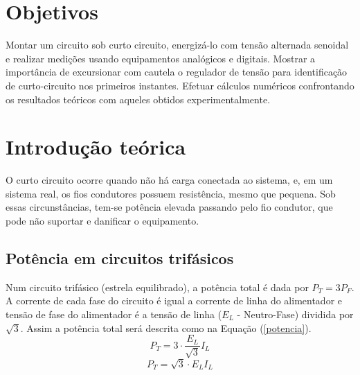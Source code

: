 \documentclass[a4paper,12pt,oneside,openany,table,xcdraw]{article}
\begin{document}
\newcommand{\thedepartment}{Faculdade de Engenharia Elétrica}
\newcommand{\thecourse}{FEELT}
\newcommand{\thetitle}{TENSÃO E CORRENTE DE CURTO-CIRCUITO EM REGULADOR DE TENSÃO SENOIDAL}
\newcommand{\thetype}{Relatório da Disciplina de Circuitos Elétricos II}
\newcommand{\theproftitle}{Bacharel em Engenharia Elétrica}
\newcommand{\thestudent}{Lesly Viviane Montúfar Berrios\\
\centering11811ETE001}
\newcommand{\theadvisor}{Prof. Wellington Maycon Santos Bernardes}
\newcommand{\thecity}{Uberlândia}

\thispagestyle{empty}


\onehalfspacing
\tableofcontents %
\newpage

\section{Objetivos} %
Montar um circuito sob curto circuito, energizá-lo com tensão alternada senoidal e realizar medições usando equipamentos analógicos e digitais. Mostrar a importância de excursionar com cautela o regulador de tensão para identificação de curto-circuito nos primeiros instantes. Efetuar cálculos numéricos confrontando os resultados teóricos com aqueles obtidos experimentalmente.

\section{Introdução teórica} %
O curto circuito ocorre quando não há carga conectada ao sistema, e, em um sistema real, os fios condutores possuem resistência, mesmo que pequena. Sob essas circunstâncias, tem-se potência elevada passando pelo fio condutor, que pode não suportar e danificar o equipamento. 

\subsection{Potência em circuitos trifásicos}
Num circuito trifásico (estrela equilibrado), a potência total é dada por $P_{T}=3P_{F}$. A corrente de cada fase do circuito é igual a corrente de linha do alimentador e tensão de fase do alimentador é a tensão de linha ($E_{L}$ - Neutro-Fase) dividida por $\sqrt{3}$. Assim a potência total será descrita como na Equação (\ref{potencia})\cite{irwin}.
\begin{equation*}
P_{T}=3\cdot \dfrac{E_{L}}{\sqrt{3}} I_{L}
\end{equation*}
\begin{equation}\label{potencia}
P_{T}=\sqrt{3}\cdot E_{L} I_{L}
\end{equation}
\end{document}
